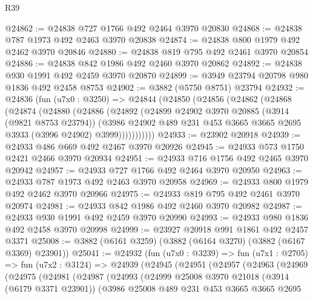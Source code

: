 \begin{lexlean}{R39}
\begin{coremodule}
@24862 := @24838 @727 @1766 @492 @2464 @3970 @20830
@24868 := @24838 @787 @1973 @492 @2463 @3970 @20838
@24874 := @24838 @800 @1979 @492 @2462 @3970 @20846
@24880 := @24838 @819 @795 @492 @2461 @3970 @20854
@24886 := @24838 @842 @1986 @492 @2460 @3970 @20862
@24892 := @24838 @930 @1991 @492 @2459 @3970 @20870
@24899 := @3949 @23794 @20798 @980 @1836 @492 @2458 @8753
@24902 := @3882 (@5750 @8751) @23794
@24932 := @24836
    (fun (u7x0 : @3250) =>
    @24844
      (@24850
        (@24856
          (@24862
            (@24868
              (@24874
                (@24880
                  (@24886
                    (@24892
                      (@24899
                        @24902
                        @3970
                        @20885
                        (@3914 (@9821 @8753 @23794))
                        (@3986
                          @24902
                          @489
                          @231
                          @453
                          @3665
                          @3665
                          @2695
                          @3933
                          (@3996 @24902)
                          @3999)))))))))))
@24933 := @23902 @20918
@24939 := @24933 @486 @669 @492 @2467 @3970 @20926
@24945 := @24933 @573 @1750 @2421 @2466 @3970 @20934
@24951 := @24933 @716 @1756 @492 @2465 @3970 @20942
@24957 := @24933 @727 @1766 @492 @2464 @3970 @20950
@24963 := @24933 @787 @1973 @492 @2463 @3970 @20958
@24969 := @24933 @800 @1979 @492 @2462 @3970 @20966
@24975 := @24933 @819 @795 @492 @2461 @3970 @20974
@24981 := @24933 @842 @1986 @492 @2460 @3970 @20982
@24987 := @24933 @930 @1991 @492 @2459 @3970 @20990
@24993 := @24933 @980 @1836 @492 @2458 @3970 @20998
@24999 := @23927 @20918 @991 @1861 @492 @2457 @3371
@25008 := @3882 (@6161 @3259) (@3882 (@6164 @3270) (@3882 (@6167 @3369) @23901))
@25041 := @24932
    (fun (u7x0 : @3239) =>
    fun (u7x1 : @2705) =>
    fun (u7x2 : @3124) =>
    @24939
      (@24945
        (@24951
          (@24957
            (@24963
              (@24969
                (@24975
                  (@24981
                    (@24987
                      (@24993
                        (@24999
                          @25008
                          @3970
                          @21018
                          (@3914 (@6179 @3371 @23901))
                          (@3986
                            @25008
                            @489
                            @231
                            @453
                            @3665
                            @3665
                            @2695

\end{coremodule}
\end{lexlean}
